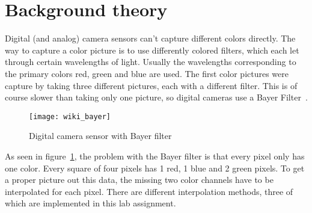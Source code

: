 \section{Background theory}

Digital (and analog) camera sensors can't capture different colors directly.
The way to capture a color picture is to use differently colored filters, which
each let through certain wavelengths of light. Usually the wavelengths
corresponding to the primary colors red, green and blue are used. The first
color pictures were capture by taking three different pictures, each with a
different filter. This is of course slower than taking only one picture, so
digital cameras use a Bayer Filter~\cite{wiki:bayer_filter}.

\begin{figure}[H]
  \centering
  \texttt{[image: wiki\_bayer]}
  \caption{Digital camera sensor with Bayer filter~\cite{wiki:bayer_filter}}
\label{fig:wiki_bayer_filter}
\end{figure}

As seen in figure~\ref{fig:wiki_bayer_filter}, the problem with the Bayer
filter is that every pixel only has one color. Every square of four pixels has
1 red, 1 blue and 2 green pixels. To get a proper picture out this data, the
missing two color channels have to be interpolated for each pixel. There are
different interpolation methods, three of which are implemented in this lab
assignment.
